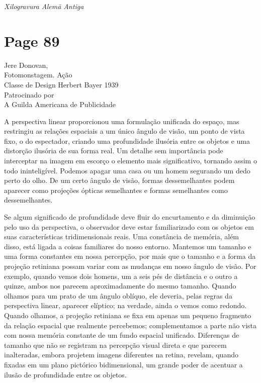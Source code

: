 \documentclass[a4paper]{article}
\begin{document}
\medskip
\noindent\textit{Xilogravura Alemã Antiga}

\newpage
\section*{Page 89}

\begingroup
\raggedright
Jere Donovan,\\
Fotomonstagem. Ação\\
Classe de Design Herbert Bayer 1939\\
Patrocinado por\\
A Guilda Americana de Publicidade
\par
\endgroup

A perspectiva linear proporcionou uma formulação unificada do espaço, mas restringiu as relações espaciais a um único ângulo de visão, um ponto de vista fixo, o do espectador, criando uma profundidade ilusória entre os objetos e uma distorção ilusória de sua forma real. Um detalhe sem importância pode interceptar na imagem em escorço o elemento mais significativo, tornando assim o todo ininteligível. Podemos apagar uma casa ou um homem segurando um dedo perto do olho. De um certo ângulo de visão, formas dessemelhantes podem aparecer como projeções ópticas semelhantes e formas semelhantes como dessemelhantes.

Se algum significado de profundidade deve fluir do encurtamento e da diminuição pelo uso da perspectiva, o observador deve estar familiarizado com os objetos em suas características tridimensionais reais. Uma constância de memória, além disso, está ligada a coisas familiares do nosso entorno. Mantemos um tamanho e uma forma constantes em nossa percepção, por mais que o tamanho e a forma da projeção retiniana possam variar com as mudanças em nosso ângulo de visão. Por exemplo, quando vemos dois homens, um a seis pés de distância e o outro a quinze, ambos nos parecem aproximadamente do mesmo tamanho. Quando olhamos para um prato de um ângulo oblíquo, ele deveria, pelas regras da perspectiva linear, aparecer elíptico; na verdade, ainda o vemos como redondo. Quando olhamos, a projeção retiniana se fixa em apenas um pequeno fragmento da relação espacial que realmente percebemos; complementamos a parte não vista com nossa memória constante de um fundo espacial unificado.
Diferenças de tamanho que não se registram na percepção visual direta e que parecem inalteradas, embora projetem imagens diferentes na retina, revelam, quando fixadas em um plano pictórico bidimensional, um grande poder de acentuar a ilusão de profundidade entre os objetos.
\end{document}
